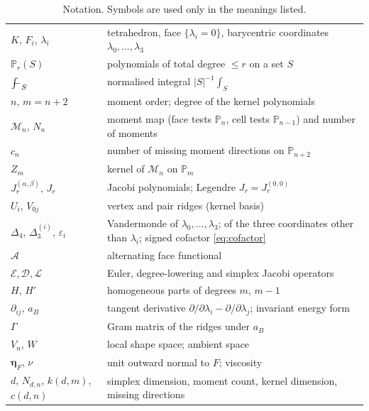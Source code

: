 \documentclass[11pt,a4paper]{article}
\theoremstyle{definition}
\theoremstyle{remark}
\newcommand{\M}{\mathcal M}
\newcommand{\avg}{\mathop{\mathchoice{{\textstyle\int}\mkern-15.5mu{-}\mkern2mu}{\int\mkern-12mu{-}\mkern1mu}{\int\mkern-11mu{-}}{\int\mkern-11mu{-}}}\nolimits}
\newcommand{\Pol}{\mathbb P}
\newcommand{\J}{J}
\begin{document}
\begin{table}[ht]
\centering\small
\caption{Notation. Symbols are used only in the meanings listed.}
\label{tab:notation}
\begin{tabular}{>{\raggedright}p{}p{}}
\toprule
\(K\), \(F_i\), \(\lambda_i\) & tetrahedron, face \(\{\lambda_i=0\}\),
 barycentric coordinates \(\lambda_0,\dots,\lambda_3\) \\
\(\Pol_r(S)\) & polynomials of total degree \(\le r\) on a set \(S\) \\
\(\avg_S\) & normalised integral \(|S|^{-1}\int_S\) \\
\(n\), \(m=n+2\) & moment order; degree of the kernel polynomials \\
\(\M_n\), \(N_n\) & moment map (face tests \(\Pol_n\), cell tests
 \(\Pol_{n-1}\)) and number of moments \\
\(c_n\) & number of missing moment directions on \(\Pol_{n+2}\) \\
\(Z_m\) & kernel of \(\M_n\) on \(\Pol_m\) \\
\(\J_r^{(\alpha,\beta)}\), \(\J_r\) & Jacobi polynomials; Legendre \(\J_r=\J_r^{(0,0)}\) \\
\(U_i\), \(V_{0j}\) & vertex and pair ridges (kernel basis) \\
\(\Delta_4\), \(\Delta_3^{(i)}\), \(\varepsilon_i\) & Vandermonde of
 \(\lambda_0,\dots,\lambda_3\); of the three coordinates other than
 \(\lambda_i\); signed cofactor \eqref{eq:cofactor} \\
\(\mathcal A\) & alternating face functional \\
\(\mathcal E,\mathcal D,\mathcal L\) & Euler, degree-lowering and
 simplex Jacobi operators \\
\(H\), \(H'\) & homogeneous parts of degrees \(m\), \(m-1\) \\
\(\partial_{ij}\), \(a_B\) & tangent derivative \(\partial/\partial\lambda_i-
 \partial/\partial\lambda_j\); invariant energy form \\
\(\Gamma\) & Gram matrix of the ridges under \(a_B\) \\
\(V_n\), \(W\) & local shape space; ambient space \\
\(\boldsymbol\eta_F\), \(\nu\) & unit outward normal to \(F\); viscosity \\
\(d\), \(N_{d,n}\), \(k(d,m)\), \(c(d,n)\) & simplex dimension, moment
 count, kernel dimension, missing directions \\
\bottomrule
\end{tabular}
\end{table}
\end{document}
